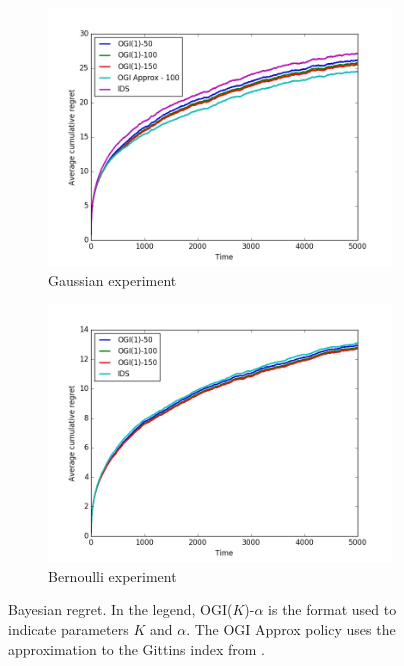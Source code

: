 \begin{figure}[h!]
	\begin{subfigure}{.5\textwidth}
		\centering
		\includegraphics[width=\linewidth]{plots/reduced_gaussian_a.jpg}
		\caption{Gaussian experiment}
		\label{fig:sub1}
	\end{subfigure}
	\begin{subfigure}{.5\textwidth}
		\centering
		\includegraphics[width=\linewidth]{plots/reduced_figure_a.jpg}
		\caption{Bernoulli experiment}
		\label{fig:sub2}
	\end{subfigure}%
	\caption{Bayesian regret. In the legend, OGI($K$)-$\alpha$ is the format used to indicate parameters $K$ and $\alpha$. The OGI Approx policy uses the approximation to the Gittins index from \cite{powell2012optimal}.}
	\label{fig:bayesian_regret}
\end{figure}

